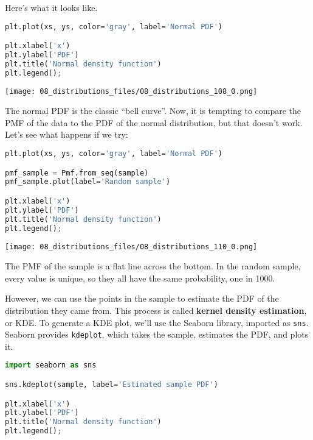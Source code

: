 Here's what it looks like.

\begin{lstlisting}[language=Python,style=source]
plt.plot(xs, ys, color='gray', label='Normal PDF')

plt.xlabel('x')
plt.ylabel('PDF')
plt.title('Normal density function')
plt.legend();
\end{lstlisting}

\begin{center}
\texttt{[image: 08\_distributions\_files/08\_distributions\_108\_0.png]}
\end{center}

The normal PDF is the classic ``bell curve''. Now, it is tempting to
compare the PMF of the data to the PDF of the normal distribution, but
that doesn't work. Let's see what happens if we try:

\begin{lstlisting}[language=Python,style=source]
plt.plot(xs, ys, color='gray', label='Normal PDF')

pmf_sample = Pmf.from_seq(sample)
pmf_sample.plot(label='Random sample')

plt.xlabel('x')
plt.ylabel('PDF')
plt.title('Normal density function')
plt.legend();
\end{lstlisting}

\begin{center}
\texttt{[image: 08\_distributions\_files/08\_distributions\_110\_0.png]}
\end{center}

The PMF of the sample is a flat line across the bottom. In the random
sample, every value is unique, so they all have the same probability,
one in 1000.

However, we can use the points in the sample to estimate the PDF of the
distribution they came from. This process is called \textbf{kernel
density estimation}, or KDE. To generate a KDE plot, we'll use the
Seaborn library, imported as \passthrough{\lstinline!sns!}. Seaborn
provides \passthrough{\lstinline!kdeplot!}, which takes the sample,
estimates the PDF, and plots it.

\begin{lstlisting}[language=Python,style=source]
import seaborn as sns

sns.kdeplot(sample, label='Estimated sample PDF')

plt.xlabel('x')
plt.ylabel('PDF')
plt.title('Normal density function')
plt.legend();
\end{lstlisting}

